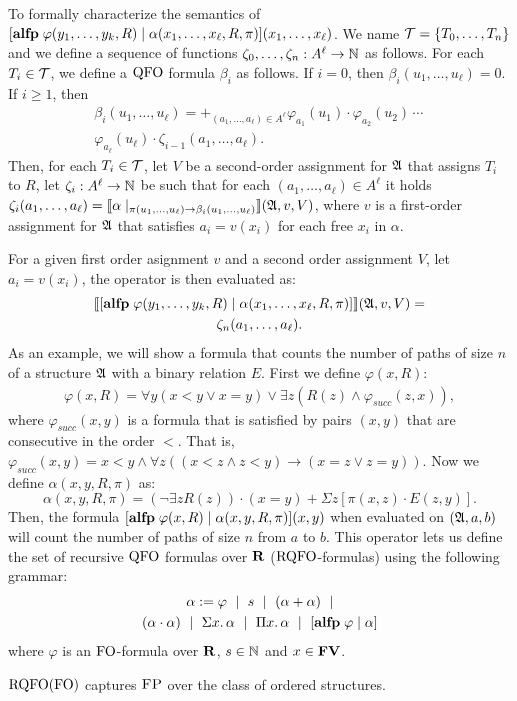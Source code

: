 To formally characterize the semantics of $[{\bf alfp} \;\varphi(y_1,\ldots,y_k,R)\mid\alpha(x_1,\ldots,x_{\ell},R,\pi)](x_1,\ldots,x_{\ell})$. %
We name $\mathcal{T} = \{T_0,\ldots,T_n\}$ and we define a sequence of functions $\zeta_0,\ldots,\zeta_n:A^{\ell}\to\mathbb{N}$ as follows. For each $T_i \in \mathcal{T}$, we define a ${\rm QFO}$ formula $\beta_i$ as follows. If $i = 0$, then $\beta_i(u_1,\ldots,u_{\ell}) = 0$. If $i \geq 1$, then
\begin{multline*}
\beta_i(u_1,\ldots,u_{\ell}) = \mathop{+}_{(a_1,\ldots,a_{\ell})\in A^{\ell}} \varphi_{a_1}(u_1)\cdot\varphi_{a_2}(u_2)\,\cdots\,\\ \varphi_{a_{\ell}}(u_{\ell})\cdot \zeta_{i-1}(a_1,\ldots,a_{\ell}).
\end{multline*}
Then, for each $T_i \in \mathcal{T}$, let $V$ be a second-order assignment for $\mathfrak{A}$ that assigns $T_i$ to $R$, let $\zeta_i: A^{\ell}\to\mathbb{N}$ be such that for each $(a_1,\ldots,a_{\ell})\in A^{\ell}$ it holds $\zeta_i(a_1,\ldots,a_{\ell}) = {\llbracket{}{\alpha\mid_{\pi(u_1,\ldots,u_{\ell})\to \beta_i(u_1,\ldots,u_{\ell})}}\rrbracket}(\mathfrak{A},v,V)$, where $v$ is a first-order assignment for $\mathfrak{A}$ that satisfies $a_i = v(x_i)$ for each free $x_i$ in $\alpha$.

For a given first order asignment $v$ and a second order assignment $V$, let $a_i = v(x_i)$, the operator is then evaluated as:
\begin{multline*}
{\llbracket{}{[{\bf alfp} \; \varphi(y_1,\ldots,y_k,R)\mid\alpha(x_1,\ldots,x_{\ell},R,\pi)]}\rrbracket}(\mathfrak{A},v,V) = \\ \zeta_n(a_1,\ldots,a_{\ell}).
\end{multline*}
As an example, we will show a formula that counts the number of paths of size $n$ of a structure $\mathfrak{A}$ with a binary relation $E$. First we define $\varphi(x,R)$:
\begin{multline*}
\varphi(x,R) = \forall y(x < y \vee x = y) \vee \exists z(R(z) \wedge \varphi_{succ}(z,x)),
\end{multline*}
where $\varphi_{succ}(x,y)$ is a formula that is satisfied by pairs $(x,y)$ that are consecutive in the order $<$. That is, $\varphi_{succ}(x,y) = x < y \wedge \forall z((x < z \wedge z < y) \to (x = z \vee z = y) )$. Now we define $\alpha(x,y,R,\pi)$ as:
$$
\alpha(x,y,R,\pi) = (\neg \exists zR(z))\cdot(x = y) + \Sigma z[\pi(x,z)\cdot E(z,y)].
$$
Then, the formula $[{\bf alfp} \;\varphi(x,R)\mid \alpha(x,y,R,\pi)](x,y)$ when evaluated on $(\mathfrak{A},a,b)$ will count the number of paths of size $n$ from $a$ to $b$.
This operator lets us define the set of recursive ${\rm QFO}$ formulas over $\mathbf{R}$ (${\rm RQFO}$-formulas) using the following grammar:
\begin{multline*}
	\label{eq-def-rqfo}
	\alpha := \varphi \ \mid \ s \ \mid \ (\alpha \add \alpha) \ \mid \\ (\alpha \mult \alpha) \ \mid \ \sa{x} \alpha \ \mid \ \pa{x} \alpha \ \mid \ [\alfp \varphi \mid \alpha]
\end{multline*}
where $\varphi$ is an ${\rm FO}$-formula over $\mathbf{R}$, $s \in \mathbb{N}$ and $x \in \mathbf{FV}$.

\begin{theorem} \label{rqfo-fo-cap}
	${\rm RQFO}({\rm FO})$ captures $\text{\sc FP}$ over the class of ordered structures.
\end{theorem}

